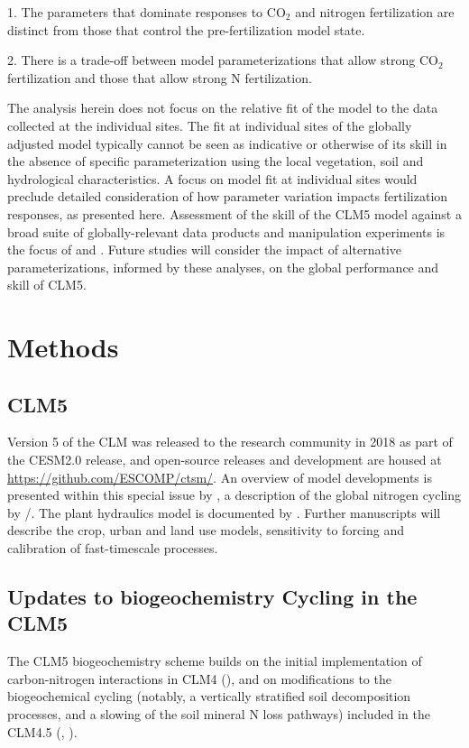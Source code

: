 \usepackage{}\documentclass[draft,linenumbers]{agujournal}
\begin{document}
1. The parameters that dominate responses to CO$_{2}$ and nitrogen fertilization are distinct from those that control the pre-fertilization model state.

2. There is a trade-off between model parameterizations that allow strong CO$_{2}$ fertilization and those that allow strong N fertilization. 

The analysis herein does not focus on the relative fit of the model to the data collected at the individual sites. The fit at individual sites of the globally adjusted model typically cannot be seen as indicative or otherwise of its skill in the absence of specific parameterization using the local vegetation, soil and hydrological characteristics. A focus on model fit at individual sites would preclude detailed consideration of how parameter variation impacts fertilization responses, as presented here. Assessment of the skill of the CLM5 model against a broad suite of globally-relevant data products and manipulation experiments is the focus of \cite{lawrence2018} and \cite{wieder2019}. Future studies will consider the impact of alternative parameterizations, informed by these analyses, on the global performance and skill of CLM5.

\section{Methods}

\subsection{CLM5}
 Version 5 of the CLM was released to the research community in 2018 as part of the CESM2.0 release, and open-source releases and development are housed at \url{https://github.com/ESCOMP/ctsm/}. An overview of model developments is presented within this special issue by \cite{lawrence2018}, a description of the global nitrogen cycling by \cite{wieder2019}/. The plant hydraulics model is documented by \cite{kennedy2019}. Further manuscripts will describe the crop, urban and land use models, sensitivity to forcing and calibration of fast-timescale processes.
 
\subsection{Updates to biogeochemistry Cycling in the CLM5}
The CLM5 biogeochemistry scheme builds on the initial implementation of carbon-nitrogen interactions in CLM4 (\cite{thornton2007}),  and on modifications to the biogeochemical cycling (notably, a vertically stratified soil decomposition processes, and a slowing of the soil mineral N loss pathways) included in the CLM4.5 (\cite{koven2013}, \cite{bonan2012}). 
\end{document}
